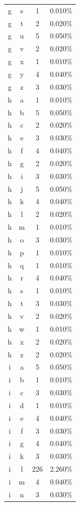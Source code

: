 \begin{longtable}{cccc}
    g & s & 1 & 0.010\% \\
    g & t & 2 & 0.020\% \\
    g & u & 5 & 0.050\% \\
    g & v & 2 & 0.020\% \\
    g & x & 1 & 0.010\% \\
    g & y & 4 & 0.040\% \\
    g & z & 3 & 0.030\% \\
    h & a & 1 & 0.010\% \\
    h & b & 5 & 0.050\% \\
    h & c & 2 & 0.020\% \\
    h & e & 3 & 0.030\% \\
    h & f & 4 & 0.040\% \\
    h & g & 2 & 0.020\% \\
    h & i & 3 & 0.030\% \\
    h & j & 5 & 0.050\% \\
    h & k & 4 & 0.040\% \\
    h & l & 2 & 0.020\% \\
    h & m & 1 & 0.010\% \\
    h & o & 3 & 0.030\% \\
    h & p & 1 & 0.010\% \\
    h & q & 1 & 0.010\% \\
    h & r & 4 & 0.040\% \\
    h & s & 1 & 0.010\% \\
    h & t & 3 & 0.030\% \\
    h & v & 2 & 0.020\% \\
    h & w & 1 & 0.010\% \\
    h & x & 2 & 0.020\% \\
    h & z & 2 & 0.020\% \\
    i & a & 5 & 0.050\% \\
    i & b & 1 & 0.010\% \\
    i & c & 3 & 0.030\% \\
    i & d & 1 & 0.010\% \\
    i & e & 4 & 0.040\% \\
    i & f & 3 & 0.030\% \\
    i & g & 4 & 0.040\% \\
    i & k & 3 & 0.030\% \\
    i & l & 226 & 2.260\% \\
    i & m & 4 & 0.040\% \\
    i & n & 3 & 0.030\% \\

\end{longtable}
